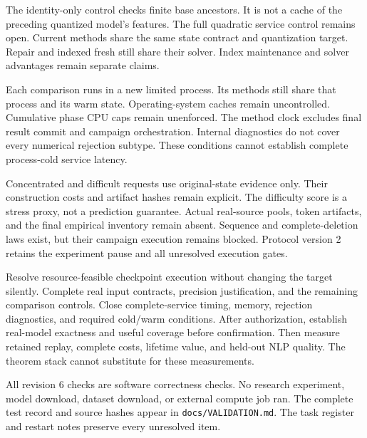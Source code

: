 The identity-only control checks finite base ancestors.
It is not a cache of the preceding quantized model's features.
The full quadratic service control remains open.
Current methods share the same state contract and quantization target.
Repair and indexed fresh still share their solver.
Index maintenance and solver advantages remain separate claims.

Each comparison runs in a new limited process.
Its methods still share that process and its warm state.
Operating-system caches remain uncontrolled.
Cumulative phase CPU caps remain unenforced.
The method clock excludes final result commit and campaign orchestration.
Internal diagnostics do not cover every numerical rejection subtype.
These conditions cannot establish complete process-cold service latency.

Concentrated and difficult requests use original-state evidence only.
Their construction costs and artifact hashes remain explicit.
The difficulty score is a stress proxy, not a prediction guarantee.
Actual real-source pools, token artifacts, and the final empirical inventory remain absent.
Sequence and complete-deletion laws exist, but their campaign execution remains blocked.
Protocol version 2 retains the experiment pause and all unresolved execution gates.

Resolve resource-feasible checkpoint execution without changing the target silently.
Complete real input contracts, precision justification, and the remaining comparison controls.
Close complete-service timing, memory, rejection diagnostics, and required cold/warm conditions.
After authorization, establish real-model exactness and useful coverage before confirmation.
Then measure retained replay, complete costs, lifetime value, and held-out NLP quality.
The theorem stack cannot substitute for these measurements.

All revision 6 checks are software correctness checks.
No research experiment, model download, dataset download, or external compute job ran.
The complete test record and source hashes appear in \texttt{docs/VALIDATION.md}.
The task register and restart notes preserve every unresolved item.
